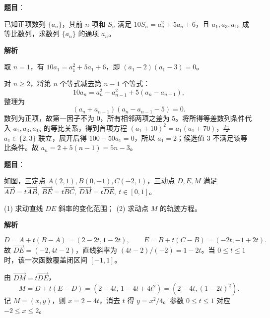 \begin{answer}

\textbf{题目}：

已知正项数列 \(\{a_n\}\)，其前 \(n\) 项和 \(S_n\) 满足 \(10S_n=a_n^2+5a_n+6\)，且 \(a_1,a_3,a_{15}\) 成等比数列，求数列 \(\{a_n\}\) 的通项 \(a_n\)。

\textbf{解析}

取 \(n=1\)，有 \(10a_1=a_1^2+5a_1+6\)，即 \((a_1-2)(a_1-3)=0\)。

对 \(n\ge2\)，将第 \(n\) 个等式减去第 \(n-1\) 个等式：
\nopagebreak[4]
\[
10a_n=a_n^2-a_{n-1}^2+5(a_n-a_{n-1}),
\]
整理为
\nopagebreak[4]
\[
(a_n+a_{n-1})(a_n-a_{n-1}-5)=0.
\]
数列为正项，故第一因子不为 0，所有相邻两项之差为 5。将所得等差数列条件代入 \(a_1,a_3,a_{15}\) 的等比关系，得到首项方程 \((a_1+10)^2=a_1(a_1+70)\)，与 \(a_1\in\{2,3\}\) 联立，展开后得 \(100-50a_1=0\)，所以 \(a_1=2\)；候选值 \(3\) 不满足该等比条件。故 \(a_n=2+5(n-1)=5n-3\)。


\end{answer}
\begin{answer}

\textbf{题目}：

如图，三定点 \(A(2,1),B(0,-1),C(-2,1)\)，三动点 \(D,E,M\) 满足 \(\overrightarrow{AD}=t\overrightarrow{AB},\ \overrightarrow{BE}=t\overrightarrow{BC},\ \overrightarrow{DM}=t\overrightarrow{DE},\ t\in[0,1]\)。

(1) 求动直线 \(DE\) 斜率的变化范围；
(2) 求动点 \(M\) 的轨迹方程。
\nopagebreak[4]
\begin{center}\end{center}
\nopagebreak[4]
\textbf{解析}


\nopagebreak[4]
\[
D=A+t(B-A)=(2-2t,1-2t),\qquad
E=B+t(C-B)=(-2t,-1+2t).
\]
故 \(\overrightarrow{DE}=(-2,4t-2)\)，直线斜率为 \((4t-2)/(-2)=1-2t\)。当 \(0\le t\le1\) 时，该一次函数覆盖闭区间 \([-1,1]\)。


由 \(\overrightarrow{DM}=t\overrightarrow{DE}\)，
\nopagebreak[4]
\[
M=D+t(E-D)=(2-4t,\,1-4t+4t^2)=(2-4t,(1-2t)^2).
\]
记 \(M=(x,y)\)，则 \(x=2-4t\)，消去 \(t\) 得 \(y=x^2/4\)。参数 \(0\le t\le1\) 对应 \(-2\le x\le2\)。



\end{answer}
